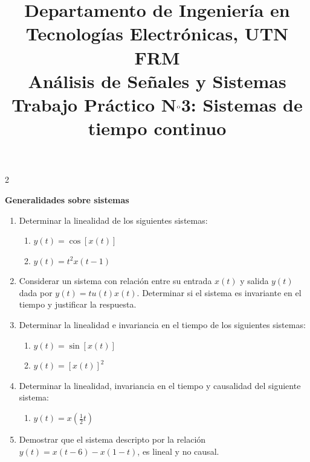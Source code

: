 \documentclass[10pt,a4paper]{article}
\title{%
	{\normalsize Departamento de Ingeniería en Tecnologías Electrónicas, UTN FRM}\\[0.1cm]
	{\large Análisis de Señales y Sistemas}\\[0.15cm]
	{\normalsize Trabajo Práctico N$^{\text o}$3: Sistemas de tiempo continuo}%
}
\author{}
\date{}
\begin{document}
	\maketitle
	\thispagestyle{fancy}
	
	\begin{multicols}{2}
		
		\label{sec:enun}
			\textbf{Generalidades sobre sistemas}
			\begin{enumerate}
			\item {Determinar la linealidad de los siguientes sistemas:}
			\begin{enumerate}
				\item $ y(t) = \cos [x(t)] $
				\item $ y(t) = t^2x(t-1) $
			\end{enumerate}
			
			\item {Considerar un sistema con relación entre su entrada $x(t)$ y salida $y(t)$ dada por $y(t)=tu(t)x(t)$. Determinar si el sistema es invariante en el tiempo y justificar la respuesta.}
			
			\item{Determinar la linealidad e invariancia en el tiempo de los siguientes sistemas:}
			\begin{enumerate}
				\item $y(t)=\sin{[x(t)]}$
				\item $y(t)=[x(t)]^2$
			\end{enumerate}
			
			\item {Determinar la linealidad, invariancia en el tiempo y causalidad del siguiente sistema:}
			\begin{enumerate}
				\item $y(t)=x\left(\frac{1}{2}t\right)$
			\end{enumerate}
			
			\item {Demostrar que el sistema descripto por la relación $y(t)=x(t-6)-x(1-t)$, es lineal y no causal.}
			

\end{enumerate}
\end{multicols}
\end{document}

